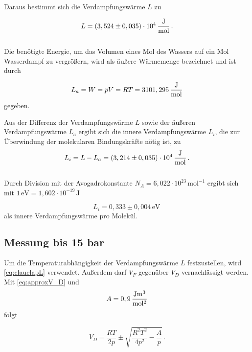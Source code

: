 Daraus bestimmt sich die Verdampfungswärme $L$ zu

\begin{equation*}
  L = (3,524 \pm 0,035) \cdot 10^4 \,\unit{\frac{\joule}{\mol}} \,.
\end{equation*} \\

Die benötigte Energie, um das Volumen eines Mol des Wassers auf ein Mol Wasserdampf zu vergrößern, wird
als äußere Wärmemenge bezeichnet und ist durch

\begin{equation*}
  L_a = W = pV = RT = 3101,295 \,\unit{\frac{\joule}{\mol}}
  \label{eq:äußereVW}
\end{equation*} gegeben.

Aus der Differenz der Verdampfungswärme $L$ sowie der äußeren Verdampfungswärme $L_a$ ergibt sich die
innere Verdampfungswärme $L_i$, die zur Überwindung der molekularen Bindungskräfte nötig ist, zu 
\begin{equation*}
  L_i = L - L_a = (3,214 \pm 0,035) \cdot 10^4 \,\unit{\frac{\joule}{\mol}} \,.
  \label{eq:innereVW}
\end{equation*} \\

Durch Division mit der Avogadrokonstante $N_A = 6,022 \cdot 10^{23} \,\unit{\mol}^{-1}$ ergibt sich
mit $1 \,\unit{\electronvolt} = 1,602 \cdot 10^{-19} \,\unit{\joule}$

\begin{equation*}
  L_i = 0,333 \pm 0,004 \,\unit{\electronvolt} \,
\end{equation*} als innere Verdampfungswärme pro Molekül.

\subsection{Messung bis 15 bar}
Um die Temperaturabhängigkeit der Verdampfungswärme $L$ festzustellen, wird \eqref{eq:clauclapL} verwendet.
Außerdem darf $V_F$ gegenüber $V_D$ vernachlässigt werden.
Mit \eqref{eq:approxV_D} und 
\begin{equation*}
  A = 0,9 \,\unit{\frac{\joule\cubic\meter}{\square\mol}}
\end{equation*} folgt

\begin{equation*}
  V_D = \frac{RT}{2p} \pm \sqrt{\frac{R^2 T^2}{4 p^2} - \frac{A}{p}}\,.
\end{equation*} \\

